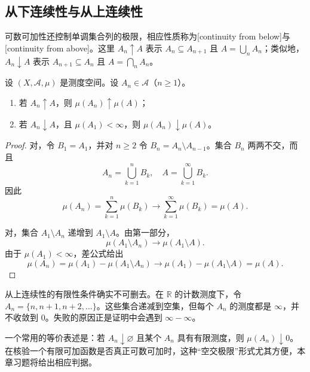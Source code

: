\subsection{从下连续性与从上连续性}
\label{b1:subsec:020103}

可数可加性还控制单调集合列的极限，相应性质称为[continuity from below]与[continuity from above]。这里 \(A_n\uparrow A\) 表示 \(A_n\subseteq A_{n+1}\) 且 \(A=\bigcup_nA_n\)；类似地，\(A_n\downarrow A\) 表示 \(A_{n+1}\subseteq A_n\) 且 \(A=\bigcap_nA_n\)。

\begin{theorem}
\label{b1:thm:measure-continuity}
设 \((X,\mathcal A,\mu)\) 是测度空间。设 \(A_n\in\mathcal A\)（\(n\ge1\)）。
\begin{enumerate}
  \item\label{b1:item:measure-continuity-below} 若 \(A_n\uparrow A\)，则 \(\mu(A_n)\uparrow\mu(A)\)；
  \item\label{b1:item:measure-continuity-above} 若 \(A_n\downarrow A\)，且 \(\mu(A_1)<\infty\)，则 \(\mu(A_n)\downarrow\mu(A)\)。
\end{enumerate}
\end{theorem}
\begin{proof}
对，令 \(B_1=A_1\)，并对 \(n\geq2\) 令 \(B_n=A_n\setminus A_{n-1}\)。集合 \(B_n\) 两两不交，而且
\[
A_n=\bigcup_{k=1}^{n}B_k,
\quad
A=\bigcup_{k=1}^{\infty}B_k.
\]
因此
\[
\mu(A_n)=\sum_{k=1}^{n}\mu(B_k)
\longrightarrow
\sum_{k=1}^{\infty}\mu(B_k)=\mu(A).
\]

对，集合 \(A_1\setminus A_n\) 递增到 \(A_1\setminus A\)。由第一部分，
\[
\mu(A_1\setminus A_n)\longrightarrow\mu(A_1\setminus A).
\]
由于 \(\mu(A_1)<\infty\)，差公式给出
\[
\mu(A_n)=\mu(A_1)-\mu(A_1\setminus A_n)
\longrightarrow
\mu(A_1)-\mu(A_1\setminus A)=\mu(A).
\]
\end{proof}

从上连续性的有限性条件确实不可删去。在 \(\mathbb R\) 的计数测度下，令 \(A_n=\{n,n+1,n+2,\ldots\}\)。这些集合递减到空集，但每个 \(A_n\) 的测度都是 \(\infty\)，并不收敛到 \(0\)。失败的原因正是证明中会遇到 \(\infty-\infty\)。

\ProseParagraphBreak

一个常用的等价表述是：若 \(A_n\downarrow\varnothing\) 且某个 \(A_n\) 具有有限测度，则 \(\mu(A_n)\downarrow0\)。在核验一个有限可加函数是否真正可数可加时，这种“空交极限”形式尤其方便，本章习题将给出相应判据。

